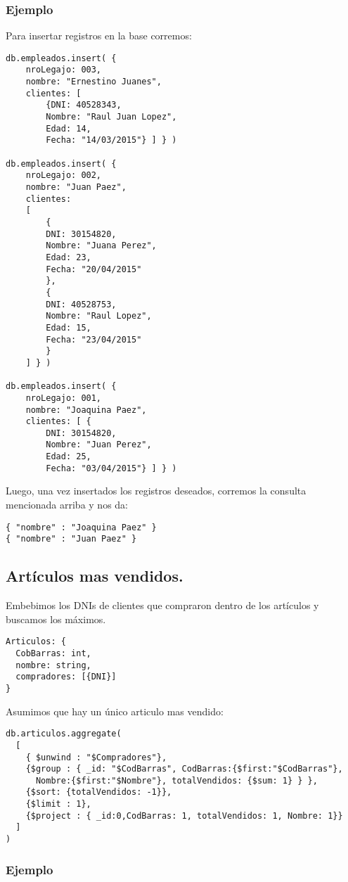 \subsubsection{Ejemplo}

Para insertar registros en la base corremos:

\begin{lstlisting}
db.empleados.insert( { 
	nroLegajo: 003, 
	nombre: "Ernestino Juanes",
	clientes: [ 
		{DNI: 40528343,  
		Nombre: "Raul Juan Lopez", 
		Edad: 14,
		Fecha: "14/03/2015"} ] } )

db.empleados.insert( { 
	nroLegajo: 002, 
	nombre: "Juan Paez",
	clientes: 
	[ 
		{
		DNI: 30154820, 
		Nombre: "Juana Perez", 
		Edad: 23,
		Fecha: "20/04/2015"
		}, 
		{
		DNI: 40528753, 
		Nombre: "Raul Lopez", 
		Edad: 15,
		Fecha: "23/04/2015"
		} 
	] } )

db.empleados.insert( { 
	nroLegajo: 001, 
	nombre: "Joaquina Paez",
	clientes: [ {
		DNI: 30154820,  
		Nombre: "Juan Perez", 
		Edad: 25,
		Fecha: "03/04/2015"} ] } )
\end{lstlisting}

Luego, una vez insertados los registros deseados, corremos la consulta mencionada arriba y nos da:

\begin{lstlisting}
{ "nombre" : "Joaquina Paez" }
{ "nombre" : "Juan Paez" }
\end{lstlisting}

\subsection{Artículos mas vendidos.}
Embebimos los DNIs de clientes que compraron dentro de los artículos y buscamos los máximos.

\begin{lstlisting}
Articulos: {
  CobBarras: int,
  nombre: string,
  compradores: [{DNI}]
}
\end{lstlisting}

Asumimos que hay un único articulo mas vendido:
\begin{lstlisting}
db.articulos.aggregate(
  [
    { $unwind : "$Compradores"},
    {$group : { _id: "$CodBarras", CodBarras:{$first:"$CodBarras"},
      Nombre:{$first:"$Nombre"}, totalVendidos: {$sum: 1} } },
    {$sort: {totalVendidos: -1}},
    {$limit : 1},
    {$project : { _id:0,CodBarras: 1, totalVendidos: 1, Nombre: 1}}
  ]
)
\end{lstlisting}

\subsubsection{Ejemplo}

